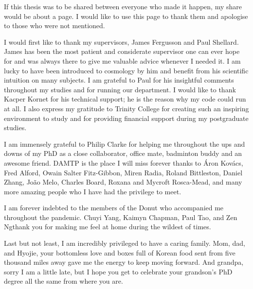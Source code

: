 
\begin{acknowledgements}      




If this thesis was to be shared between everyone who made it happen, my share would be about a page. I would like to use this page to thank them and apologise to those who were not mentioned.

I would first like to thank my supervisors, James Fergusson and Paul Shellard. James has been the most patient and considerate supervisor one can ever hope for and was always there to give me valuable advice whenever I needed it. I am lucky to have been introduced to cosmology by him and benefit from his scientific intuition on many subjects. I am grateful to  Paul for his insightful comments throughout my studies and for running our department. I would like to thank Kacper Kornet for his technical support; he is the reason why my code could run at all. I also express my gratitude to Trinity College for creating such an inspiring environment to study and for providing financial support during my postgraduate studies.

I am immensely grateful to Philip Clarke for helping me throughout the ups and downs of my PhD as a close collaborator, office mate, badminton buddy and an awesome friend. DAMTP is the place I will miss forever thanks to Áron Kovács, Fred Alford, Owain Salter Fitz-Gibbon, Miren Radia, Roland Bittleston, Daniel Zhang, João Melo, Charles Board, Roxana and Mycroft Rosca-Mead, and many more amazing people who I have had the privilege to meet.

I am forever indebted to the members of the Donut who accompanied me throughout the pandemic. Chuyi Yang, Kaimyn Chapman, Paul Tao, and Zen Ng\textemdash thank you for making me feel at home during the wildest of times.

Last but not least, I am incredibly privileged to have a caring family. Mom, dad, and Hyojie, your bottomless love and boxes full of Korean food sent from five thousand miles away gave me the energy to keep moving forward. And grandpa, sorry I am a little late, but I hope you get to celebrate your grandson's PhD degree all the same from where you are.



\end{acknowledgements}
